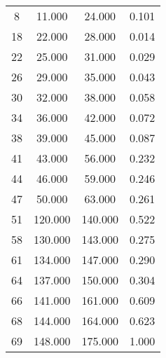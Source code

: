 % 
\begin{tabular}{cccc}
  \hline
  \hline
8 & 11.000 & 24.000 & 0.101 \\ 
  18 & 22.000 & 28.000 & 0.014 \\ 
  22 & 25.000 & 31.000 & 0.029 \\ 
  26 & 29.000 & 35.000 & 0.043 \\ 
  30 & 32.000 & 38.000 & 0.058 \\ 
  34 & 36.000 & 42.000 & 0.072 \\ 
  38 & 39.000 & 45.000 & 0.087 \\ 
  41 & 43.000 & 56.000 & 0.232 \\ 
  44 & 46.000 & 59.000 & 0.246 \\ 
  47 & 50.000 & 63.000 & 0.261 \\ 
  51 & 120.000 & 140.000 & 0.522 \\ 
  58 & 130.000 & 143.000 & 0.275 \\ 
  61 & 134.000 & 147.000 & 0.290 \\ 
  64 & 137.000 & 150.000 & 0.304 \\ 
  66 & 141.000 & 161.000 & 0.609 \\ 
  68 & 144.000 & 164.000 & 0.623 \\ 
  69 & 148.000 & 175.000 & 1.000 \\ 
   \hline
\end{tabular}
